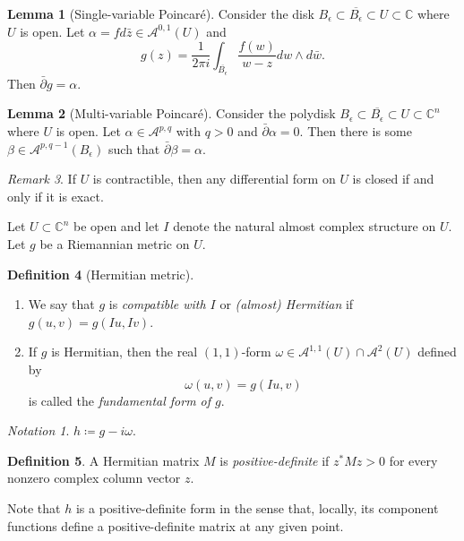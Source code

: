 \documentclass[10pt,letterpaper,cm]{nupset}
\theoremstyle{definition}
\newtheorem{defn}{Definition}[subsection]
\theoremstyle{theorem}
\newtheorem{lemma}[defn]{Lemma}
\theoremstyle{remark}
\newtheorem{remark}[defn]{Remark}
\newtheorem*{notation}{Notation}
\newcommand{\A}{\mathcal A}
\newcommand{\C}{\mathbb C}
\newcommand{\1}{\mathbb{1}}
\newcommand{\0}{\vec 0}
\newcommand{\be}{\begin{enumerate}}
\newcommand{\ee}{\end{enumerate}}
\begin{document}
\begin{lemma}[Single-variable Poincar\'e]
Consider the disk $B_{\epsilon} \subset \overline{B_{\epsilon}} \subset U \subset \C$ where $U$ is open.  Let $\alpha = f{d{\bar{z}}} \in \A^{0,1}\left(U\right)$ and $$ g(z) = \frac{1}{2\pi i}\int_{\overline{B_{\epsilon}}}\frac{f(w)}{w-z}{d{w} \wedge d{\bar{w}}}.$$ Then $\bar{\partial}{g} = \alpha$. 
\end{lemma}

\begin{lemma}[Multi-variable Poincar\'e]
Consider the polydisk $B_{\epsilon} \subset \overline{B_{\epsilon}} \subset U \subset \C^n$  where $U$ is open. Let $\alpha \in \A^{p,q}$ with $q>0$ and $\bar{\partial}{\alpha} =0$. Then there is some $\beta \in \A^{p, q-1}\left(B_{\epsilon}\right)$ such that $\bar{\partial}{\beta} = \alpha$.
\end{lemma}

\begin{remark}
If $U$ is contractible, then any differential form on $U$ is closed if and only if it is exact.
\end{remark}

Let $U \subset \C^n$ be open and let $I$ denote the natural almost complex structure on $U$. Let $g$ be a Riemannian metric on $U$.

\begin{defn}[Hermitian metric] $ $
\be
\item  We say that $g$ is \textit{compatible with $I$} or \textit{(almost) Hermitian} if $g\left(u,v\right) = g\left(I{u}, I{v}\right)$.
\item If $g$ is Hermitian, then the real $\left(1,1\right)$-form $\omega \in \A^{1,1}\left(U\right) \cap \A^2\left(U\right)$ defined by $$\omega\left(u,v\right) = g \left(I{u}, v\right)$$ is called the \textit{fundamental form of $g$}.
\ee
\end{defn}

\begin{notation}
$h \coloneqq g -i{\omega}$.
\end{notation}

\begin{defn}
A Hermitian matrix $M$ is \textit{positive-definite} if $z^{\ast}Mz >0$ for every nonzero complex column vector $z$.
\end{defn}

Note that $h$ is a positive-definite form in the sense that, locally, its component functions define a positive-definite matrix at any given point. 
\end{document}
